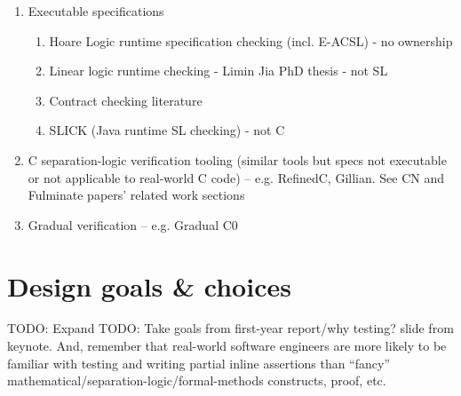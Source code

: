 \documentclass[withindex,glossary]{cam-thesis}
\begin{document}
\begin{enumerate}
  \item Executable specifications
  \begin{enumerate}
    \item Hoare Logic runtime specification checking (incl. E-ACSL) - no ownership
    \item Linear logic runtime checking - Limin Jia PhD thesis - not SL
    \item Contract checking literature
    \item SLICK (Java runtime SL checking) - not C
  \end{enumerate}
  \item C separation-logic verification tooling (similar tools but specs not executable or not applicable to real-world C code) -- e.g. RefinedC, Gillian. See CN and Fulminate papers' related work sections
  \item Gradual verification -- e.g. Gradual C0
\end{enumerate}



\chapter{Design goals \& choices}

TODO: Expand
TODO: Take goals from first-year report/why testing? slide from keynote. And, remember that real-world software engineers are more likely to be familiar with testing and writing partial inline assertions than ``fancy'' mathematical/separation-logic/formal-methods constructs, proof, etc.

\newcommand{\myparagraph}[1]{\paragraph{#1}}
\end{document}
